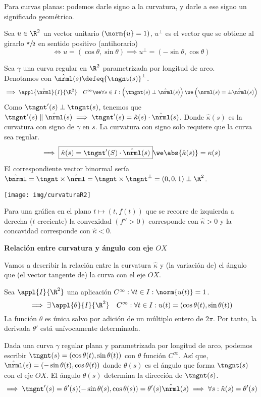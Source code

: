 Para curvas planas: podemos darle signo a la curvatura, y darle a ese signo un significado geométrico.
\begin{defn}
	Sea $u \in \R^2$ un vector unitario $(\norm{u}=1)$, $u^\perp$ es el vector que se obtiene al girarlo $\sfrac{\pi}{2}$ en sentido positivo (antihorario) $$\iff u=(\cos{\theta}, \sin{\theta}) \implies u^\perp=(-\sin{\theta}, \cos{\theta})$$
\end{defn}

Sea $\gamma$ una curva regular en $\R^2$ parametrizada por longitud de arco. \\
Denotamos con $\hat{\nrml}(s)\defeq{\tngnt(s)}^\perp$.
\[\implies \appl{\hat{\nrml}}{I}{\R^2} \quad C^\infty \we \forall s \in I : \left(\tngnt(s) \perp \hat{\nrml}(s)\right) \we \left(\nrml(s)=\pm \hat{\nrml}(s)\right)\]
Como $\tngnt'(s) \perp \tngnt(s)$, tenemos que $\tngnt'(s) \parallel \hat{\nrml}(s) \implies \tngnt'(s) = \hat{\kappa}(s) \cdot \hat{\nrml}(s)$. Donde $\hat{\kappa}(s)$ es la curvatura con signo de $\gamma$ en $s$.
La curvatura con signo solo requiere que la curva sea regular.
\[\implies \boxed{\hat{\kappa}(s)=\tngnt'(S)\cdot\hat{\nrml}(s)} \we \abs{\hat{\kappa}(s)}=\kappa(s)\]
El correspondiente vector binormal sería $\hat{\bnrml}=\tngnt\times\hat{\nrml}=\tngnt\times\tngnt^\perp=(0, 0, 1) \perp \R^2$.
\begin{center}
	\texttt{[image: img/curvaturaR2]}	
\end{center}
Para una gráfica en el plano $t\mapsto (t, f(t))$ que se recorre de izquierda a derecha ($t$ creciente) la convexidad $(f'' > 0)$ corresponde con $\hat{\kappa} > 0$ y la concavidad corresponde con $\hat{\kappa} < 0$.

\textbf{Relación entre curvatura y ángulo con eje $OX$}

Vamos a describir la relación entre la curvatura $\hat{\kappa}$ y (la variación de) el ángulo que (el vector tangente de) la curva con el eje $OX$.

\begin{lem}
	Sea $\appl{I}{\R^2}$ una aplicación $C^\infty : \forall t\in I : \norm{u(t)} = 1$.
	\[\implies \exists\, \appl{\theta}{I}{\R^2} \quad C^\infty : \forall t \in I : u(t)=(\cos{\theta(t)}, \sin{\theta(t)})\]
	La función $\theta$ es única salvo por adición de un múltiplo entero de $2\pi$. Por tanto, la derivada $\theta'$ está unívocamente determinada.
\end{lem}
Dada una curva $\gamma$ regular plana y parametrizada por longitud de arco, podemos escribir $\tngnt(s)=(\cos{\theta(t)}, \sin{\theta(t)})$ con $\theta$ función $C^\infty$. Así que, $\hat{\nrml}(s)=(-\sin{\theta(t)}, \cos{\theta(t)})$ donde $\theta(s)$ es el ángulo que forma $\tngnt(s)$ con el eje $OX$. El ángulo $\theta(s)$ determina la dirección de $\tngnt(s)$.
\[\implies \tngnt'(s)=\theta'(s)(-\sin{\theta(s)}, \cos{\theta(s)})=\theta'(s) \hat{\nrml}(s) \implies \forall s : \hat{\kappa}(s) = \theta'(s)\]

